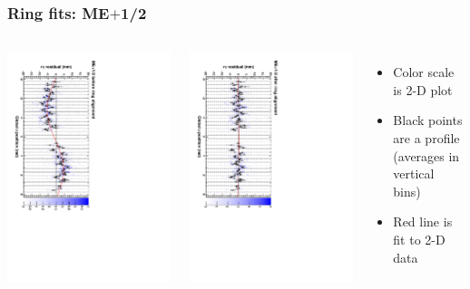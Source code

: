 \documentclass[compress]{beamer}
\begin{document}
\begin{frame}
\frametitle{Ring fits: ME$+$1/2}
\vfill
\begin{columns}
\includegraphics[height=\linewidth, angle=90]{ringfits_before/mep12.pdf}

\includegraphics[height=\linewidth, angle=90]{ringfits_after/mep12.pdf}
\begin{itemize}
\item Color scale is 2-D plot
\item Black points are a profile (averages in vertical bins)
\item Red line is fit to 2-D data
\end{itemize}
\end{columns}
\end{frame}
\end{document}

